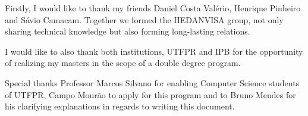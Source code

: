 

Firstly, I would like to thank my friends Daniel Costa Valério, Henrique Pinheiro and Sávio Camacam. Together we formed the HEDANVISA group, not only sharing technical knowledge but also forming long-lasting relations.

I would like to also thank both institutions, \gls{UTFPR} and \gls{IPB} for the opportunity of realizing my masters in the scope of a double degree program.

Special thanks Professor Marcos Silvano for enabling Computer Science students of \gls{UTFPR}, Campo Mourão to apply for this program and to Bruno Mendes for his clarifying explanations in regards to writing this document.

